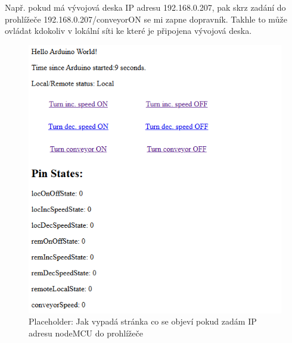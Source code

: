 Např. pokud má vývojová deska IP adresu 192.168.0.207, pak skrz zadání do prohlížeče 192.168.0.207/conveyorON se mi zapne dopravník. Takhle to může ovládat kdokoliv v lokální síti ke které je připojena vývojová deska.

\begin{figure}[H]
    \centering
    \includegraphics[width=0.8\linewidth]{images/nodeMCUlandingPage.png}
    \caption{Placeholder: Jak vypadá stránka co se objeví pokud zadám IP adresu nodeMCU do prohlížeče}
    \label{fig:NodeMCUlandingPage}
\end{figure}



